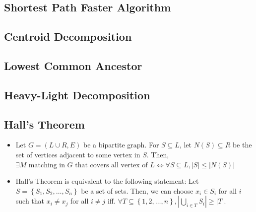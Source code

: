 \documentclass[9pt,landscape,a4paper,twocolumn]{extarticle}
\begin{document}
% 

\subsection{Shortest Path Faster Algorithm}


\subsection{Centroid Decomposition}


% 

\subsection{Lowest Common Ancestor}


\subsection{Heavy-Light Decomposition}


\subsection{Hall's Theorem}
\begin{itemize}
    \item
    Let $G=\left(L\cup R,E\right)$ be a bipartite graph.
    For $S\subseteq L$, let $N\left(S\right)\subseteq R$ be the set of vertices adjacent to some vertex in $S$.
    Then, $\exists M \text{ matching in } G \text{ that covers all vertex of } L \Leftrightarrow \forall S\subseteq L, |S|\leq |N(S)|$

    \item Hall's Theorem is equivalent to the following statement:
    Let $S=\left\{ S_1,S_2,\ldots,S_n \right\}$ be a set of sets.
    Then, we can choose $x_i\in S_i$ for all $i$ such that $x_i\neq x_j$ for all $i\neq j$
    iff. $\forall T\subseteq \left\{ 1,2,\ldots,n \right\}, \left| \bigcup_{i\in T} S_i \right|\geq |T|$.
\end{itemize}
\end{document}
